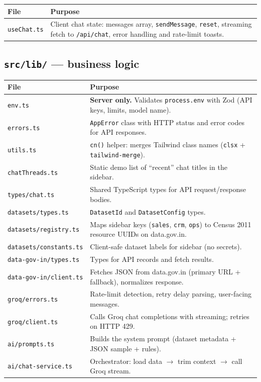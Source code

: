 \documentclass[11pt,a4paper]{article}
\begin{document}
\begin{longtable}{@{}p{4.2cm}p{9.8cm}@{}}
\toprule
\textbf{File} & \textbf{Purpose} \\
\midrule
\endhead
\texttt{useChat.ts} & Client chat state: messages array, \texttt{sendMessage}, \texttt{reset}, streaming fetch to \texttt{/api/chat}, error handling and rate-limit toasts. \\
\bottomrule
\end{longtable}

\subsection{\texttt{src/lib/} --- business logic}

\begin{longtable}{@{}p{4.2cm}p{9.8cm}@{}}
\toprule
\textbf{File} & \textbf{Purpose} \\
\midrule
\endhead
\texttt{env.ts} & \textbf{Server only.} Validates \texttt{process.env} with Zod (API keys, limits, model name). \\
\texttt{errors.ts} & \texttt{AppError} class with HTTP status and error codes for API responses. \\
\texttt{utils.ts} & \texttt{cn()} helper: merges Tailwind class names (\texttt{clsx} + \texttt{tailwind-merge}). \\
\texttt{chatThreads.ts} & Static demo list of ``recent'' chat titles in the sidebar. \\
\texttt{types/chat.ts} & Shared TypeScript types for API request/response bodies. \\
\midrule
\texttt{datasets/types.ts} & \texttt{DatasetId} and \texttt{DatasetConfig} types. \\
\texttt{datasets/registry.ts} & Maps sidebar keys (\texttt{sales}, \texttt{crm}, \texttt{ops}) to Census 2011 resource UUIDs on data.gov.in. \\
\texttt{datasets/constants.ts} & Client-safe dataset labels for sidebar (no secrets). \\
\midrule
\texttt{data-gov-in/types.ts} & Types for API records and fetch results. \\
\texttt{data-gov-in/client.ts} & Fetches JSON from data.gov.in (primary URL + fallback), normalizes response. \\
\midrule
\texttt{groq/errors.ts} & Rate-limit detection, retry delay parsing, user-facing messages. \\
\texttt{groq/client.ts} & Calls Groq chat completions with streaming; retries on HTTP 429. \\
\midrule
\texttt{ai/prompts.ts} & Builds the system prompt (dataset metadata + JSON sample + rules). \\
\texttt{ai/chat-service.ts} & Orchestrator: load data $\rightarrow$ trim context $\rightarrow$ call Groq stream. \\
\bottomrule
\end{longtable}
\end{document}
